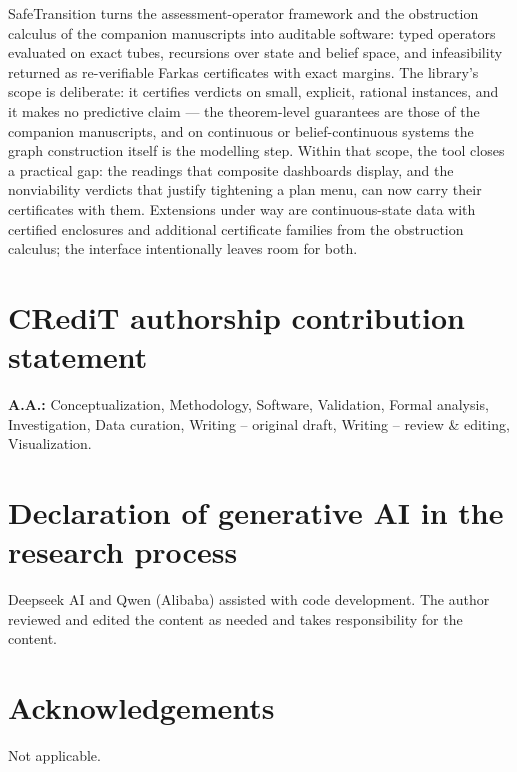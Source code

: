 \documentclass[3p,11pt]{elsarticle}
\begin{document}
SafeTransition turns the assessment-operator framework and the obstruction
calculus of the companion manuscripts into auditable software: typed
operators evaluated on exact tubes, recursions over state and belief space,
and infeasibility returned as re-verifiable Farkas certificates with exact
margins. The library's scope is deliberate: it certifies verdicts on small,
explicit, rational instances, and it makes no predictive claim --- the
theorem-level guarantees are those of the companion manuscripts, and on
continuous or belief-continuous systems the graph construction itself is
the modelling step. Within that scope, the tool closes a practical gap:
the readings that composite dashboards display, and the nonviability
verdicts that justify tightening a plan menu, can now carry their
certificates with them. Extensions under way are continuous-state data with
certified enclosures and additional certificate families from the
obstruction calculus; the interface intentionally leaves room for both.

\section*{CRediT authorship contribution statement}
\textbf{A.A.:} Conceptualization, Methodology, Software, Validation,
Formal analysis, Investigation, Data curation, Writing -- original draft,
Writing -- review \& editing, Visualization.

\section*{Declaration of generative AI in the research process}
Deepseek AI and Qwen (Alibaba) assisted with code development. The author
reviewed and edited the content as needed and takes responsibility for the
content.

\section*{Acknowledgements}
Not applicable.
\end{document}
